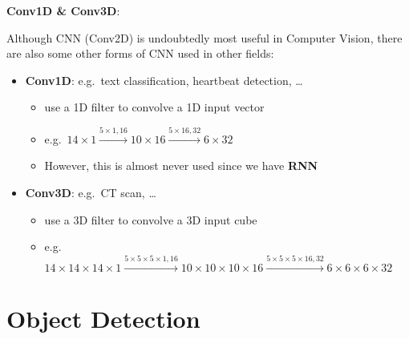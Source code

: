 \documentclass[
]{book}
\providecommand{\tightlist}{%
  \setlength{\itemsep}{0pt}\setlength{\parskip}{0pt}}
\begin{document}
\textbf{Conv1D \& Conv3D}:

Although CNN (Conv2D) is undoubtedly most useful in Computer Vision,
there are also some other forms of CNN used in other fields:

\begin{itemize}
\item
  \textbf{Conv1D}: e.g.~text classification, heartbeat detection,
  \ldots{}

  \begin{itemize}
  \tightlist
  \item
    use a 1D filter to convolve a 1D input vector
  \item
    e.g.~\(14\times1\xrightarrow{5\times1,16}10\times16\xrightarrow{5\times16,32}6\times32\)
  \item
    However, this is almost never used since we have \textbf{RNN}\\
  \end{itemize}
\item
  \textbf{Conv3D}: e.g.~CT scan, \ldots{}

  \begin{itemize}
  \tightlist
  \item
    use a 3D filter to convolve a 3D input cube
  \item
    e.g.~\(14\times14\times14\times1\xrightarrow{5\times5\times5\times1,16}10\times10\times10\times16\xrightarrow{5\times5\times5\times16,32}6\times6\times6\times32\)
  \end{itemize}
\end{itemize}

\hypertarget{object-detection}{%
\section{Object Detection}\label{object-detection}}
\end{document}
